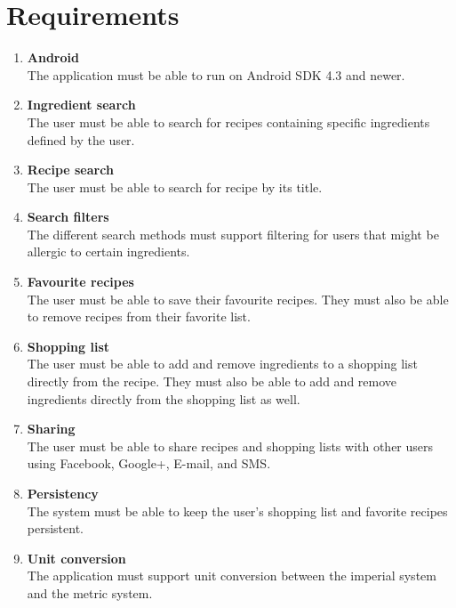 \section{Requirements}
\begin{enumerate}
  \item\label{req:android} \textbf{Android} \\
    The application must be able to run on Android SDK 4.3 and newer.
    
  \item\label{req:ingredientsearch} \textbf{Ingredient search} \\
    The user must be able to search for recipes containing specific ingredients defined by the user.
    
  \item\label{req:recipesearch} \textbf{Recipe search} \\
    The user must be able to search for recipe by its title.
    
  \item\label{req:searchfilters} \textbf{Search filters} \\
    The different search methods must support filtering for users that might be allergic to certain ingredients.
    
  \item\label{req:favourite} \textbf{Favourite recipes} \\
    The user must be able to save their favourite recipes. They must also be able to remove recipes from their favorite list.
    
  \item\label{req:shoppinglist} \textbf{Shopping list} \\
    The user must be able to add and remove ingredients to a shopping list directly from the recipe. They must also be able to add and remove ingredients directly from the shopping list as well.
    
  \item\label{req:sharing} \textbf{Sharing} \\
    The user must be able to share recipes and shopping lists with other users using Facebook, Google+, E-mail, and SMS.
    
  \item\label{req:persistency} \textbf{Persistency} \\
    The system must be able to keep the user's shopping list and favorite recipes persistent.
    
  \item\label{req:unitconversion} \textbf{Unit conversion} \\
    The application must support unit conversion between the imperial system and the metric system.
    

\end{enumerate}
